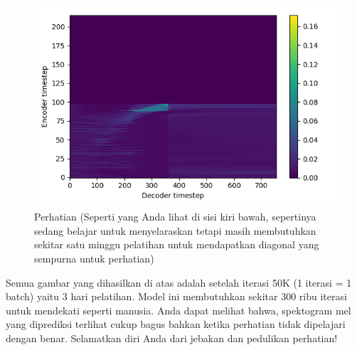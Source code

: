 \begin{figure}[H]
        \centerline{\includegraphics[scale=.5]{figures/ref3}}
        \caption{Perhatian (Seperti yang Anda lihat di sisi kiri bawah, sepertinya sedang belajar untuk menyelaraskan tetapi masih membutuhkan sekitar satu minggu pelatihan untuk mendapatkan diagonal yang sempurna untuk perhatian)}
		\label{ref3}
\end{figure}
Semua gambar yang dihasilkan di atas adalah setelah iterasi 50K (1 iterasi = 1 batch) yaitu 3 hari pelatihan. Model ini membutuhkan sekitar 300 ribu iterasi untuk mendekati seperti manusia. Anda dapat melihat bahwa, spektogram mel yang diprediksi terlihat cukup bagus bahkan ketika perhatian tidak dipelajari dengan benar. Selamatkan diri Anda dari jebakan dan pedulikan perhatian!

